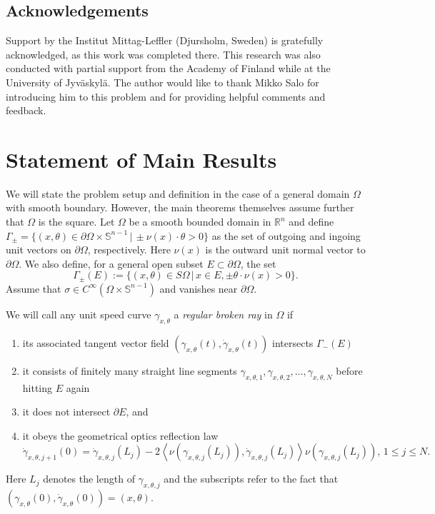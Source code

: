 \documentclass[10pt]{amsart}
\theoremstyle{definition}
\theoremstyle{definition}
\theoremstyle{definition}
\newcommand{ \rn }[1]{\mathbb{R}^{#1}}
\begin{document}
\subsection*{Acknowledgements}Support by the Institut Mittag-Leffler (Djursholm, Sweden) is gratefully acknowledged, as this work was completed there. This research was also conducted with partial support from the Academy of Finland while at the University of Jyv\"askyl\"a. The author would like to thank Mikko Salo for introducing him to
this problem and for providing helpful comments and feedback.

\section{Statement of Main Results \label{sec:mainresults}}
We will state the problem setup and definition in the case of a general domain $\Omega$ with smooth boundary. However, the main theorems themselves assume further that $\Omega$ is the square. Let $\Omega$ be a smooth bounded domain in $\rn{n}$ and define $\Gamma_{\pm} = \{(x,\theta) \in \partial \Omega \times \mathbb{S}^{n-1} \, | \, \pm \nu(x) \cdot \theta >0\}$ as the set of outgoing and ingoing unit vectors on $\partial \Omega$, respectively. Here $\nu(x)$ is the outward unit normal vector to $\partial \Omega$. We also define, for a general open subset $E \subset \partial \Omega$, the set
\begin{equation}
\Gamma_{\pm}(E) := \{(x,\theta) \in S\Omega \, | \, x \in E, \pm \theta \cdot \nu(x) > 0\}.
\end{equation}
Assume that $\sigma \in C^{\infty}(\Omega \times \mathbb{S}^{n-1})$ and vanishes near $\partial \Omega$.

We will call any unit speed curve $\gamma_{x,\theta}$ a \textit{regular broken ray} in $\Omega$ if
\begin{enumerate}
\item[(a)] its associated tangent vector field $(\gamma_{x,\theta}(t), \dot{\gamma}_{x,\theta}(t))$ intersects $\Gamma_{-}(E)$\\
\item[(b)] it consists of finitely many straight line segments $\gamma_{x,\theta,1}, \gamma_{x,\theta,2}, \ldots, \gamma_{x,\theta,N}$ before hitting $E$ again\\
\item[(c)] it does not intersect $\partial E$, and\\
\item[(d)] it obeys the geometrical optics reflection law 
\begin{equation}
\dot{\gamma}_{x,\theta,j+1}(0) = \dot{\gamma}_{x,\theta,j}(L_{j}) - 2\left\langle \nu(\gamma_{x,\theta,j}(L_{j})),\dot{\gamma}_{x,\theta,j}(L_{j}) \right\rangle \nu(\gamma_{x,\theta,j}(L_{j})), \,1 \leq j \leq N.
\end{equation}
\end{enumerate}
Here $L_{j}$ denotes the length of $\gamma_{x,\theta,j}$ and the subscripts refer to the fact that $(\gamma_{x,\theta}(0), \dot{\gamma}_{x,\theta}(0)) = (x,\theta)$.
\end{document}
